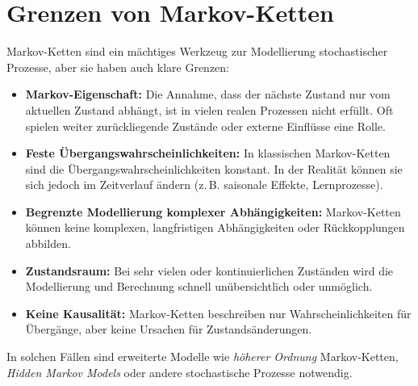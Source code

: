 \section{Grenzen von Markov-Ketten}

Markov-Ketten sind ein mächtiges Werkzeug zur Modellierung stochastischer Prozesse, aber sie haben auch klare Grenzen:

\begin{itemize}
    \item \textbf{Markov-Eigenschaft:} Die Annahme, dass der nächste Zustand nur vom aktuellen Zustand abhängt, ist in vielen realen Prozessen nicht erfüllt. Oft spielen weiter zurückliegende Zustände oder externe Einflüsse eine Rolle.
    \item \textbf{Feste Übergangswahrscheinlichkeiten:} In klassischen Markov-Ketten sind die Übergangswahrscheinlichkeiten konstant. In der Realität können sie sich jedoch im Zeitverlauf ändern (z.\,B. saisonale Effekte, Lernprozesse).
    \item \textbf{Begrenzte Modellierung komplexer Abhängigkeiten:} Markov-Ketten können keine komplexen, langfristigen Abhängigkeiten oder Rückkopplungen abbilden.
    \item \textbf{Zustandsraum:} Bei sehr vielen oder kontinuierlichen Zuständen wird die Modellierung und Berechnung schnell unübersichtlich oder unmöglich.
    \item \textbf{Keine Kausalität:} Markov-Ketten beschreiben nur Wahrscheinlichkeiten für Übergänge, aber keine Ursachen für Zustandsänderungen.
\end{itemize}

In solchen Fällen sind erweiterte Modelle wie \emph{höherer Ordnung} Markov-Ketten, \emph{Hidden Markov Models} oder andere stochastische Prozesse notwendig.
